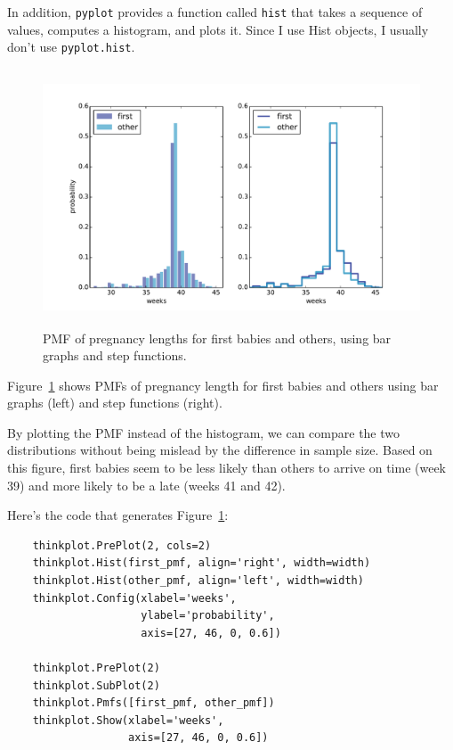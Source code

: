 \documentclass[12pt]{book}
\begin{document}
In addition, {\tt pyplot} provides a function called {\tt hist} that
takes a sequence of values, computes a histogram, and plots it.
Since I use Hist objects, I usually don't use {\tt pyplot.hist}.

\begin{figure}
\centerline{\includegraphics[height=3.0in]{figs/probability_nsfg_pmf.pdf}}
\caption{PMF of pregnancy lengths for first babies and others, using
  bar graphs and step functions.}
\label{probability_nsfg_pmf}
\end{figure}

Figure~\ref{probability_nsfg_pmf} shows PMFs of pregnancy length for
first babies and others using bar graphs (left) and step functions
(right).

By plotting the PMF instead of the histogram, we can compare the two
distributions without being mislead by the difference in sample
size.  Based on this figure, first babies seem to be less likely than
others to arrive on time (week 39) and more likely to be a late (weeks
41 and 42).

Here's the code that generates Figure~\ref{probability_nsfg_pmf}:

\begin{verbatim}
    thinkplot.PrePlot(2, cols=2)
    thinkplot.Hist(first_pmf, align='right', width=width)
    thinkplot.Hist(other_pmf, align='left', width=width)
    thinkplot.Config(xlabel='weeks',
                     ylabel='probability',
                     axis=[27, 46, 0, 0.6])

    thinkplot.PrePlot(2)
    thinkplot.SubPlot(2)
    thinkplot.Pmfs([first_pmf, other_pmf])
    thinkplot.Show(xlabel='weeks',
                   axis=[27, 46, 0, 0.6])
\end{verbatim}
\end{document}
